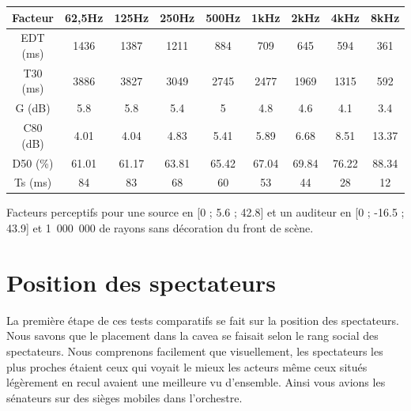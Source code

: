\begin{tableth} 
 \begin{tabular}{| *{9}{c|}} 
 \hline 
 Facteur & 62,5Hz & 125Hz & 250Hz & 500Hz & 1kHz & 2kHz & 4kHz & 8kHz \\ 
 \hline 
 \hline 
\gls{EDT} (ms)& 1436& 1387& 1211& 884& 709& 645& 594& 361 \\ 
 \hline 
\gls{T30} (ms)& 3886& 3827& 3049& 2745& 2477& 1969& 1315& 592 \\ 
 \hline 
\gls{G} (dB)& 5.8& 5.8& 5.4& 5& 4.8& 4.6& 4.1& 3.4 \\ 
 \hline 
\gls{C80} (dB)& 4.01& 4.04& 4.83& 5.41& 5.89& 6.68& 8.51& 13.37 \\ 
 \hline 
\gls{D50} (\%)& 61.01& 61.17& 63.81& 65.42& 67.04& 69.84& 76.22& 88.34 \\ 
 \hline 
\gls{Ts} (ms)& 84& 83& 68& 60& 53& 44& 28& 12 \\ 
 \hline 
\end{tabular} 
 \caption{Facteurs perceptifs pour une source en [0 ; 5.6 ; 42.8] et un auditeur en [0 ; -16.5 ; 43.9] et 1~000~000 de rayons sans décoration du front de scène.} 
 \label{tab_fact_sansdec} 
 \end{tableth}


\section{Position des spectateurs}
La première étape de ces tests comparatifs se fait sur la position des spectateurs. Nous savons que le placement dans la \gls{cavea} se faisait selon le rang social des spectateurs. Nous comprenons facilement que visuellement, les spectateurs les plus proches étaient ceux qui voyait le mieux les acteurs même ceux situés légèrement en recul avaient une meilleure vu d'ensemble. Ainsi vous avions les sénateurs sur des sièges mobiles dans l'orchestre.

